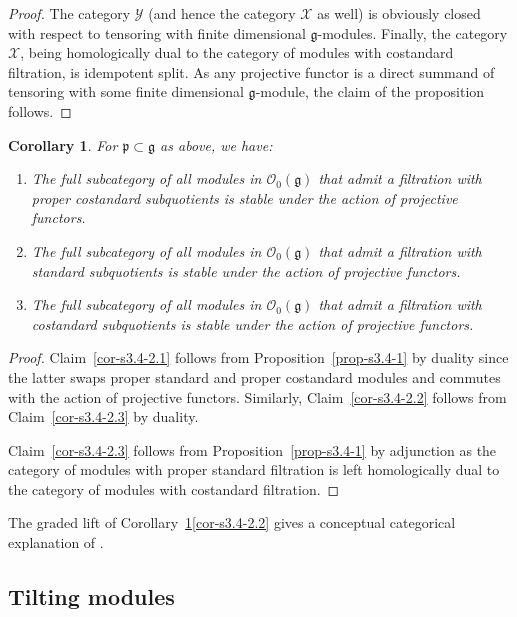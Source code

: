 \documentclass[a4paper]{amsart}
\newtheorem{corollary}[theorem]{Corollary}
\begin{document}
\begin{proof}
The category $\mathcal{Y}$ (and hence the category $\mathcal{X}$ as well) 
is obviously closed with respect to 
tensoring with finite dimensional $\mathfrak{g}$-modules. 
Finally, the category $\mathcal{X}$, being homologically dual to 
the category of modules with costandard filtration, is idempotent
split. As any projective functor is a direct summand of tensoring
with some finite dimensional $\mathfrak{g}$-module, 
the claim of the proposition follows.
\end{proof}

\begin{corollary}\label{cor-s3.4-2}
For $\mathfrak{p}\subset \mathfrak{g}$ as above, we have:
\begin{enumerate}[$($a$)$]
\item \label{cor-s3.4-2.1} The full 
subcategory of all modules in $\mathcal{O}_0(\mathfrak{g})$
that admit a filtration with proper costandard subquotients is
stable under the action of projective functors.
\item \label{cor-s3.4-2.2} The full 
subcategory of all modules in $\mathcal{O}_0(\mathfrak{g})$
that admit a filtration with standard subquotients is
stable under the action of projective functors.
\item \label{cor-s3.4-2.3} The full 
subcategory of all modules in $\mathcal{O}_0(\mathfrak{g})$
that admit a filtration with costandard subquotients is
stable under the action of projective functors.
\end{enumerate}
\end{corollary}

\begin{proof}
Claim~\eqref{cor-s3.4-2.1} follows from 
Proposition~\ref{prop-s3.4-1} by duality since the
latter swaps proper standard and proper costandard modules
and commutes with the action of projective functors.
Similarly, Claim~\eqref{cor-s3.4-2.2}
follows from Claim~\eqref{cor-s3.4-2.3} by duality.

Claim~\eqref{cor-s3.4-2.3} follows from Proposition~\ref{prop-s3.4-1}
by adjunction as the category of modules with {
proper standard filtration is left homologically dual to the category of
modules with costandard filtration.}
\end{proof}

{
The graded lift of 
Corollary~\ref{cor-s3.4-2}\eqref{cor-s3.4-2.2} gives a conceptual
categorical explanation of \cite[Theorem~3.2]{GH07}.}


\subsection{Tilting modules}\label{s3.6}
\end{document}
